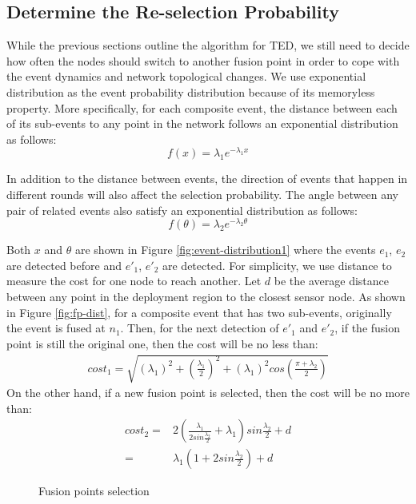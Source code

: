 \subsection{Determine the Re-selection Probability}
While the previous sections outline the algorithm for TED, we still need to decide how often the nodes should switch to another fusion point in order to cope with the event dynamics and network topological changes. We use exponential distribution as the event probability distribution because of its memoryless property. More specifically, for each composite event, the distance between each of its sub-events to any point in the network follows an exponential distribution as follows:
\begin{displaymath}
f(x)={\lambda}_1e^{-{\lambda}_1x}
\end{displaymath}

In addition to the distance between events, the direction of events that happen in different rounds will also affect the selection probability. The angle between any pair of related events also satisfy an exponential distribution as follows:
\begin{displaymath}
f(\theta)={\lambda}_2e^{-{\lambda}_2\theta}
\end{displaymath}

Both \(x\) and \(\theta\) are shown in Figure \ref{fig:event-distribution1} where the events \(e_1\), \(e_2\) are detected before and \(e'_1\), \(e'_2\) are detected. For simplicity, we use distance to measure the cost for one node to reach another. Let \(d\) be the average distance between any point in the deployment region to the closest sensor node. As shown in Figure \ref{fig:fp-dist}, for a composite event that has two sub-events, originally the event is fused at \(n_1\). Then, for the next detection of \(e'_1\) and \(e'_2\), if the fusion point is still the original one, then the cost will be no less than:
\begin{align*}
cost_1=\sqrt{({\lambda}_1)^2+(\frac{{\lambda}_1}{2})^2+({\lambda}_1)^2cos(\frac{\pi+{\lambda}_2}{2})}
\end{align*}
On the other hand, if a new fusion point is selected, then the cost will be no more than:
\begin{align*}
cost_2=&2(\frac{{\lambda}_1}{2sin\frac{{\lambda}_2}{2}}+{\lambda}_1)sin\frac{{\lambda}_2}{2}+d\\
=&{\lambda}_1(1+2sin\frac{{\lambda}_2}{2})+d
\end{align*}

\begin{figure}
\centering
{}
\caption{Fusion points selection}
\label{fig:centralizedCEDU}
\end{figure}

